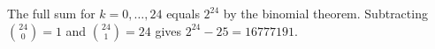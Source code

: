 The full sum for $k=0,\ldots,24$ equals $2^{24}$ by the binomial theorem. Subtracting $\binom{24}{0}=1$ and $\binom{24}{1}=24$ gives $2^{24}-25=\boxed{16777191}$.
